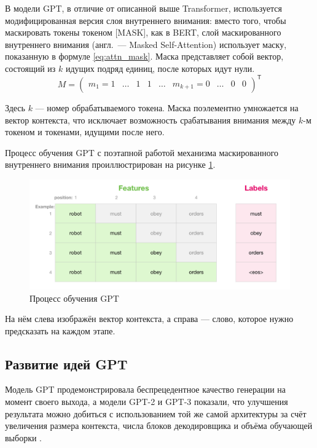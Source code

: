 В модели GPT, в отличие от описанной выше Transformer, используется модифицированная версия слоя внутреннего внимания: вместо того, чтобы маскировать токены токеном [MASK], как в BERT, слой маскированного внутреннего внимания (англ. --- Masked Self-Attention) использует маску, показанную в формуле \ref{eq:attn_mask}. Маска представляет собой вектор, состоящий из $k$ идущих подряд единиц, после которых идут нули.
\begin{equation}
    \label{eq:attn_mask}
    M=\left(\begin{matrix}
        m_1 = 1 & \hdots & 1 & 1 & \hdots & m_{k+1} = 0 & \hdots & 0 & 0
    \end{matrix}\right)^\textsf{T}
\end{equation}

Здесь $k$ --- номер обрабатываемого токена. Маска поэлементно умножается на вектор контекста, что исключает возможность срабатывания внимания между $k$-м токеном и токенами, идущими после него.

Процесс обучения GPT с поэтапной работой механизма маскированного внутреннего внимания проиллюстрирован на рисунке \ref*{fig:gpt_training}.

\begin{figure}[H]
    \centering
    \includegraphics[width=\textwidth]{../inc/images/gpt_training.png}
    \caption{Процесс обучения GPT}
    \label{fig:gpt_training}
\end{figure}

На нём слева изображён вектор контекста, а справа --- слово, которое нужно предсказать на каждом этапе.

\subsection{Развитие идей GPT}

Модель GPT продемонстрировала беспрецедентное качество генерации на момент своего выхода, а модели GPT-2 и GPT-3 показали, что улучшения результата можно добиться с использованием той же самой архитектуры за счёт увеличения размера контекста, числа блоков декодировщика и объёма обучающей выборки \cite{art:gpt3}.

